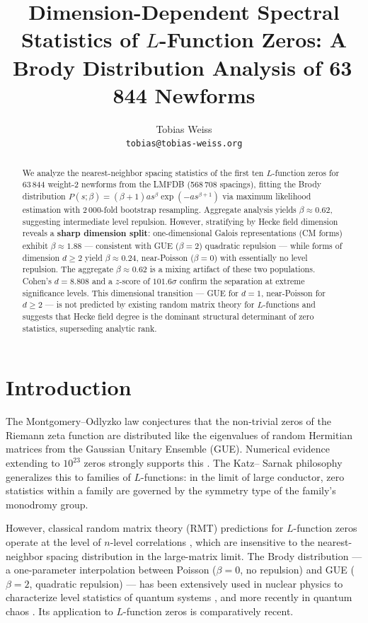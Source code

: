 \documentclass[11pt]{article}
\title{Dimension-Dependent Spectral Statistics of $L$-Function Zeros:
  A Brody Distribution Analysis of 63\,844 Newforms}
\author{Tobias Weiss \\ \texttt{tobias@tobias-weiss.org}}
\date{}
\begin{document}
\maketitle

\begin{abstract}
We analyze the nearest-neighbor spacing statistics of the first ten
$L$-function zeros for 63\,844 weight-2 newforms from the LMFDB
(568\,708 spacings), fitting the Brody distribution
$P(s;\beta)=(\beta+1)a s^\beta\exp(-a s^{\beta+1})$ via maximum
likelihood estimation with 2\,000-fold bootstrap resampling.
Aggregate analysis yields $\beta\approx0.62$, suggesting intermediate
level repulsion.  However, stratifying by Hecke field dimension
reveals a \textbf{sharp dimension split}: one-dimensional Galois
representations (CM forms) exhibit $\beta\approx1.88$ --- consistent
with GUE ($\beta=2$) quadratic repulsion --- while forms of dimension
$d\ge2$ yield $\beta\approx0.24$, near-Poisson ($\beta=0$) with
essentially no level repulsion.  The aggregate $\beta\approx0.62$ is a
mixing artifact of these two populations.  Cohen's $d = 8.808$ and a
$z$-score of $101.6\sigma$ confirm the separation at extreme
significance levels.  This dimensional transition --- GUE for $d=1$,
near-Poisson for $d\ge2$ --- is not predicted by existing random matrix
theory for $L$-functions and suggests that Hecke field degree is the
dominant structural determinant of zero statistics, superseding
analytic rank.
\end{abstract}

\section{Introduction}
\label{sec:intro}

The Montgomery--Odlyzko law \cite{montgomery1973, odlyzko1987}
conjectures that the non-trivial zeros of the Riemann zeta function are
distributed like the eigenvalues of random Hermitian matrices from the
Gaussian Unitary Ensemble (GUE).  Numerical evidence extending to
$10^{23}$ zeros strongly supports this \cite{odlyzko1989}.  The Katz--
Sarnak philosophy \cite{katz1999} generalizes this to families of
$L$-functions: in the limit of large conductor, zero statistics within
a family are governed by the symmetry type of the family's monodromy
group.

However, classical random matrix theory (RMT) predictions for
$L$-function zeros operate at the level of $n$-level correlations
\cite{rudnick1996}, which are insensitive to the nearest-neighbor
spacing distribution in the large-matrix limit.  The Brody
distribution \cite{brody1973} --- a one-parameter interpolation between
Poisson ($\beta=0$, no repulsion) and GUE ($\beta=2$, quadratic
repulsion) --- has been extensively used in nuclear physics to
characterize level statistics of quantum systems \cite{brody1981},
and more recently in quantum chaos \cite{gutzwiller1990}.  Its
application to $L$-function zeros is comparatively recent.
\end{document}
